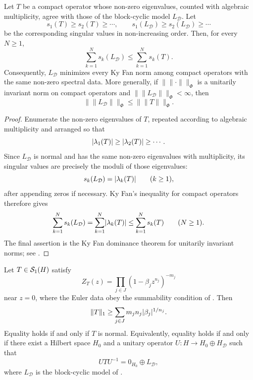 \begin{theorem}
  \label{thm:kyfan-dominance}
  Let \(T\) be a compact operator whose non-zero eigenvalues, counted
  with algebraic multiplicity, agree with those of the block-cyclic
  model \(L_{\mathcal D}\). Let
  \[
    s_1(T)\ge s_2(T)\ge \cdots,
    \qquad
    s_1(L_{\mathcal D})\ge s_2(L_{\mathcal D})\ge \cdots
  \]
  be the corresponding singular values in non-increasing order. Then, for
  every \(N\ge 1\),
  \[
    \sum_{k=1}^N s_k(L_{\mathcal D})
    \le \sum_{k=1}^N s_k(T).
  \]
  Consequently, \(L_{\mathcal D}\) minimizes every Ky Fan norm among
  compact operators with the same non-zero spectral data. More
  generally, if \(\|\!\|\cdot\|\!\|_{\Phi}\) is a unitarily invariant
  norm on compact operators and
  \(
    \|\!\|L_{\mathcal D}\|\!\|_{\Phi}<\infty
  \),
  then
  \[
    \|\!\|L_{\mathcal D}\|\!\|_{\Phi}
    \le \|\!\|T\|\!\|_{\Phi}.
  \]
\end{theorem}

\begin{proof}
  Enumerate the non-zero eigenvalues of \(T\), repeated according to
  algebraic multiplicity and arranged so that
  \[
    \lvert \lambda_1(T) \rvert\ge \lvert \lambda_2(T) \rvert\ge \cdots.
  \]
  Since \(L_{\mathcal D}\) is normal and has the same non-zero
  eigenvalues with multiplicity, its singular values are precisely the
  moduli of those eigenvalues:
  \[
    s_k(L_{\mathcal D})=\lvert \lambda_k(T) \rvert
    \qquad (k\ge 1),
  \]
  after appending zeros if necessary. Ky Fan's inequality for compact
  operators \cite{Fan1951} therefore gives
  \[
    \sum_{k=1}^N s_k(L_{\mathcal D})
    =\sum_{k=1}^N\lvert \lambda_k(T) \rvert
    \le \sum_{k=1}^N s_k(T)
    \qquad (N\ge 1).
  \]
  The final assertion is the Ky Fan dominance theorem for unitarily
  invariant norms; see \cite[Chapter~IV]{Bhatia1997}.
\end{proof}

\begin{theorem}
  \label{thm:trace-norm-minimality}
  Let \(T\in \mathcal S_1(H)\) satisfy
  \[
    Z_T(z)=\prod_{j\in J}(1-\beta_j z^{n_j})^{-m_j}
  \]
  near \(z=0\), where the Euler data obey the summability condition of
  . Then
  \[
    \|T\|_1\ge \sum_{j\in J}m_jn_j\lvert \beta_j \rvert^{1/n_j}.
  \]
  Equality holds if and only if \(T\) is normal. Equivalently, equality
  holds if and only if there exist a Hilbert space \(H_0\) and a unitary
  operator \(U:H\to H_0\oplus H_{\mathcal D}\) such that
  \[
    UTU^{-1}=0_{H_0}\oplus L_{\mathcal D},
  \]
  where \(L_{\mathcal D}\) is the block-cyclic model of
  .
\end{theorem}

